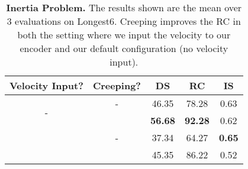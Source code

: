 \begin{table}[t]
\small
    \setlength{\tabcolsep}{6pt}
    \centering
    \begin{tabular}{c| c | c c c }
        \textbf{Velocity Input?} & \textbf{Creeping?} & \textbf{DS}  & \textbf{RC}  & \textbf{IS}  \\
        \hline
        \multirow{2}{*}{-} & - & 46.35 & 78.28 & 0.63\\
        &  & \textbf{56.68} & \textbf{92.28} & 0.62 \\
        \hline
        \multirow{2}{*}{} & - & 37.34 & 64.27 & \textbf{0.65}\\
        &  & 45.35 & 86.22 & 0.52\\
        \hline
    \end{tabular}
    \caption{\textbf{Inertia Problem.} The results shown are the mean over 3 evaluations on Longest6. Creeping improves the RC in both the setting where we input the velocity to our encoder and our default configuration (no velocity input).}
    \label{tab:ablation_creeping}
    \vspace{-0.0cm}
\end{table}
